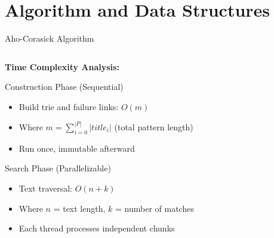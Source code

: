 \documentclass[aspectratio=169]{beamer}
\begin{document}
\section{Algorithm and Data Structures}

\begin{frame}{Aho-Corasick Algorithm}
\begin{columns}
\begin{column}{0.5\textwidth}

\vspace{0.3cm}
\textbf{Time Complexity Analysis:}
\begin{block}{Construction Phase (Sequential)}
\begin{itemize}
    \item Build trie and failure links: \( O(m) \)
    \item Where \( m = \sum_{i=0}^{|P|}|title_i| \) (total pattern length)
    \item Run once, immutable afterward
\end{itemize}
\end{block}

\begin{block}{Search Phase (Parallelizable)}
\begin{itemize}
    \item Text traversal: \( O(n + k) \)
    \item Where \( n \) = text length, \( k \) = number of matches
    \item Each thread processes independent chunks
\end{itemize}
\end{block}
\end{column}
\begin{column}{0.5\textwidth}
\begin{center}
\end{center}
\end{column}
\end{columns}
\end{frame}
\end{document}
